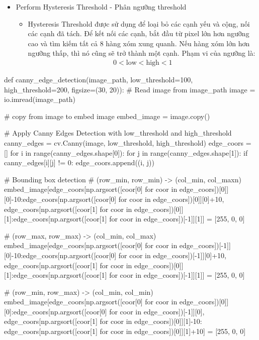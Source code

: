 \documentclass{article}
\begin{document}
\begin{itemize}
\begin{itemize}
		\end{itemize}
		\item Perform Hysteresis Threshold - Phân ngưỡng threshold
		\begin{itemize}
			\item Hysteresis Threshold được sử dụng để loại bỏ các cạnh yếu và cộng, nối các cạnh đã tách. Để kết nối các cạnh, bắt đầu từ pixel lớn hơn ngưỡng cao và tìm kiếm tất cả 8 hàng xóm xung quanh. Nếu hàng xóm lớn hơn ngưỡng thấp, thì nó cũng sẽ trở thành một cạnh. Phạm vi của ngưỡng là:
			\begin{align*}
				0 < \text{low} < \text{high} < 1
			\end{align*}
		\end{itemize}
	\end{itemize}
	\begin{python}
		def canny_edge_detection(image_path, low_threshold=100, high_threshold=200, figsize=(30, 20)):
			# Read image from image_path
			image = io.imread(image_path)
			
			# copy from image to embed image
			embed_image = image.copy()
			
			# Apply Canny Edges Detection with low_threshold and high_threshold
			canny_edges = cv.Canny(image, low_threshold, high_threshold)
			edge_coors = []
			for i in range(canny_edges.shape[0]):
				for j in range(canny_edges.shape[1]):
					if canny_edges[i][j] != 0:
						edge_coors.append((i, j))
			
			# Bounding box detection
			# (row_min, row_min) -> (col_min, col_maxn)
			embed_image[edge_coors[np.argsort([coor[0] for coor in edge_coors])[0]][0]-10:edge_coors[np.argsort([coor[0] for coor in edge_coors])[0]][0]+10, edge_coors[np.argsort([coor[1] for coor in edge_coors])[0]][1]:edge_coors[np.argsort([coor[1] for coor in edge_coors])[-1]][1]] = [255, 0, 0]
			
			# (row_max, row_max) -> (col_min, col_max)
			embed_image[edge_coors[np.argsort([coor[0] for coor in edge_coors])[-1]][0]-10:edge_coors[np.argsort([coor[0] for coor in edge_coors])[-1]][0]+10, edge_coors[np.argsort([coor[1] for coor in edge_coors])[0]][1]:edge_coors[np.argsort([coor[1] for coor in edge_coors])[-1]][1]] = [255, 0, 0]
			
			# (row_min, row_max) -> (col_min, col_min)
			embed_image[edge_coors[np.argsort([coor[0] for coor in edge_coors])[0]][0]:edge_coors[np.argsort([coor[0] for coor in edge_coors])[-1]][0], edge_coors[np.argsort([coor[1] for coor in edge_coors])[0]][1]-10: edge_coors[np.argsort([coor[1] for coor in edge_coors])[0]][1]+10] = [255, 0, 0]
			

\end{python}
\end{document}
